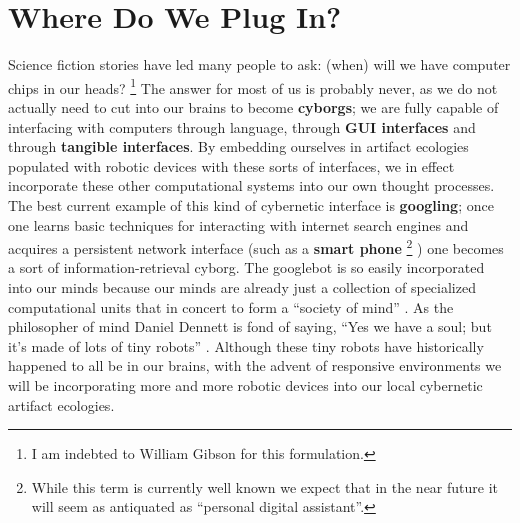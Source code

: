 \section{Where Do We Plug In?}
%
Science fiction stories have led many people to ask: (when) will we have computer chips in our heads?%
\footnote{I am indebted to William Gibson \citeyearpar{gibson_distrust} for this formulation.} 
The answer for most of us is probably never, as we do not actually need to cut into our brains to become \textbf{cyborgs}; we are fully capable of interfacing with computers through language, through \textbf{GUI interfaces} and through \textbf{tangible interfaces}.
By embedding ourselves in artifact ecologies populated with robotic devices with these sorts of interfaces, we in effect incorporate these other computational systems into our own thought processes.
The best current example of this kind of cybernetic interface is \textbf{googling}; once one learns basic techniques for interacting with internet search engines and acquires a persistent network interface (such as a \textbf{smart phone}%
\footnote{While this term is currently well known we expect that in the near future it will seem as antiquated as ``personal digital assistant''.}%
) one becomes a sort of information-retrieval cyborg.
The googlebot is so easily incorporated into our minds because our minds are already just a collection of specialized computational units that in concert to form a ``society of mind'' \citep{society_of_mind}. 
As the philosopher of mind Daniel Dennett is fond of saying, ``Yes we have a soul; but it's made of lots of tiny robots'' \citeyearpar[][p. 1]{freedom_evolves}. Although these tiny robots have historically happened to all be in our brains, with the advent of responsive environments we will be incorporating more and more robotic devices into our local cybernetic artifact ecologies.


